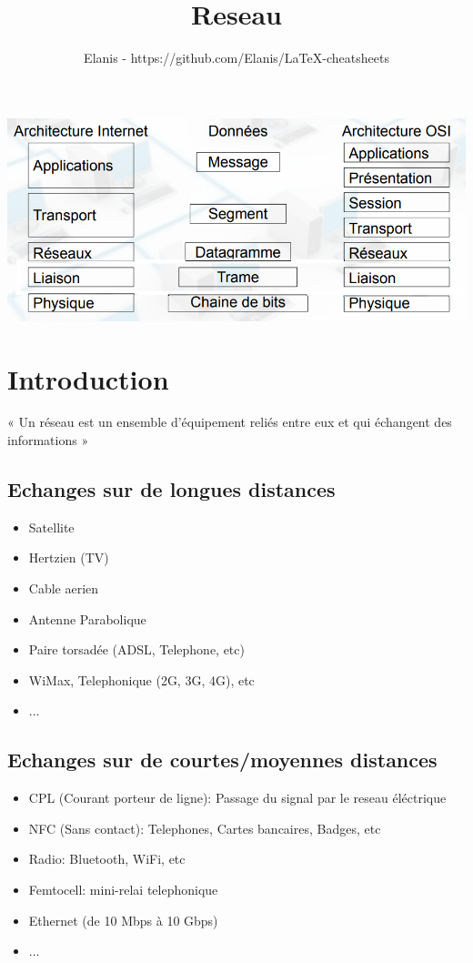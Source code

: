 \documentclass[a4paper, 12pt, french]{article}
\title{Reseau}
\author{Elanis - https://github.com/Elanis/LaTeX-cheatsheets}
\date{}
\begin{document}
	\maketitle

	\includegraphics[width=13.8cm]{reseau_modele_osi}

	\section{Introduction}

	« Un réseau est un ensemble d'équipement reliés entre eux et qui échangent des informations »

	\subsection{Echanges sur de longues distances}
	\begin{itemize}
		\item Satellite
		\item Hertzien (TV)
		\item Cable aerien
		\item Antenne Parabolique
		\item Paire torsadée (ADSL, Telephone, etc)
		\item WiMax, Telephonique (2G, 3G, 4G), etc
		\item ...
	\end{itemize}

	\subsection{Echanges sur de courtes/moyennes distances}
	\begin{itemize}
		\item CPL (Courant porteur de ligne): Passage du signal par le reseau éléctrique
		\item NFC (Sans contact): Telephones, Cartes bancaires, Badges, etc
		\item Radio: Bluetooth, WiFi, etc
		\item Femtocell: mini-relai telephonique
		\item Ethernet (de 10 Mbps à 10 Gbps)
		\item ...
	\end{itemize}
	
\end{document}
